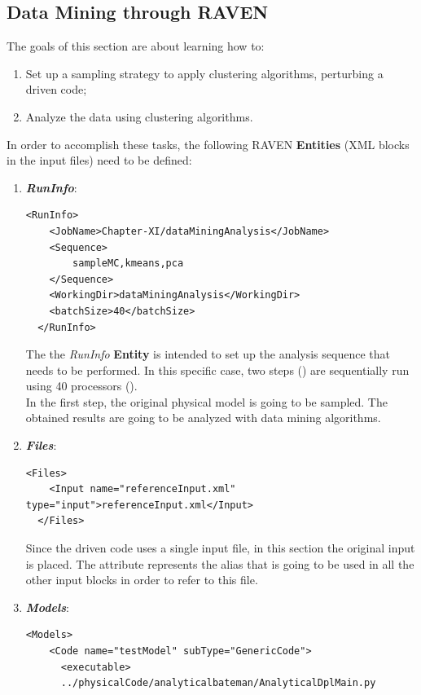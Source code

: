 \subsection{Data Mining through RAVEN}
\label{subsub:DMraven}
The goals of this section are about learning how to:
 \begin{enumerate}
   \item Set up a sampling strategy to apply clustering algorithms, perturbing a driven code;
  \item Analyze the data using clustering algorithms.
\end{enumerate}  
In order to accomplish these tasks, the following RAVEN \textbf{Entities} (XML blocks in the input files) need to be defined:
\begin{enumerate}
   \item \textbf{\textit{RunInfo}}:
\begin{lstlisting}[style=XML,morekeywords={arg,extension,pauseAtEnd,overwrite}]
  <RunInfo>
    <JobName>Chapter-XI/dataMiningAnalysis</JobName>
    <Sequence>
        sampleMC,kmeans,pca
    </Sequence>
    <WorkingDir>dataMiningAnalysis</WorkingDir>
    <batchSize>40</batchSize>
  </RunInfo>
\end{lstlisting}
   The the \textit{RunInfo} \textbf{Entity} is intended  to set up the analysis sequence that
   needs to be performed. In this specific case, two steps  () are sequentially run 
   using 40 processors (). 
   \\In the first step, the original physical model is going to be sampled. 
   The obtained results are going to be analyzed with data mining 
   algorithms. 
   \item \textbf{\textit{Files}}:
\begin{lstlisting}[style=XML,morekeywords={arg,extension,pauseAtEnd,overwrite}]
  <Files>
    <Input name="referenceInput.xml" type="input">referenceInput.xml</Input>
  </Files>
\end{lstlisting}
   Since the driven code uses a single input file, in this section the original input is placed. The attribute   represents the alias that is going to be 
   used in all the other input blocks in order to refer to this file. 
   \item \textbf{\textit{Models}}:
\begin{lstlisting}[style=XML,morekeywords={arg,extension,pauseAtEnd,overwrite}]
  <Models>
    <Code name="testModel" subType="GenericCode">
      <executable>
      ../physicalCode/analyticalbateman/AnalyticalDplMain.py

\end{lstlisting}
\end{enumerate}
